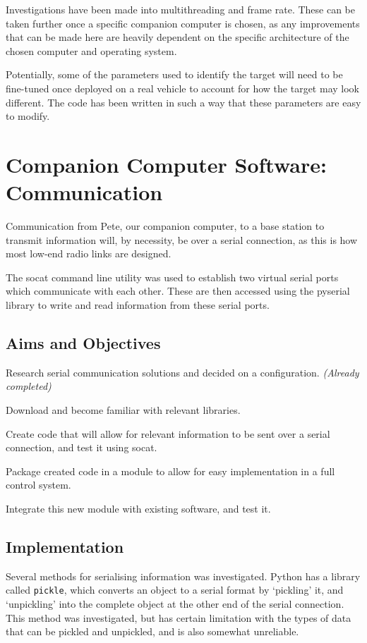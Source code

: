 \documentclass[11pt]{article}
\begin{document}
Investigations have been made into multithreading and frame rate. These can be taken further once a specific companion computer is chosen, as any improvements that can be made here are heavily dependent on the specific architecture of the chosen computer and operating system.

Potentially, some of the parameters used to identify the target will need to be fine-tuned once deployed on a real vehicle to account for how the target may look different. The code has been written in such a way that these parameters are easy to modify.

\section{Companion Computer Software: Communication}
Communication from Pete, our companion computer, to a base station to transmit information will, by necessity, be over a serial connection, as this is how most low-end radio links are designed.

The socat\cite{socat} command line utility was used to establish two virtual serial ports which communicate with each other. These are then accessed using the pyserial library to write and read information from these serial ports.

\subsection{Aims and Objectives}
\begin{compactenum}
    \item Research serial communication solutions and decided on a configuration. \emph{(Already completed)}
    \item Download and become familiar with relevant libraries.
    \item Create code that will allow for relevant information to be sent over a serial connection, and test it using socat.
    \item Package created code in a module to allow for easy implementation in a full control system.
    \item Integrate this new module with existing software, and test it.
\end{compactenum}


\subsection{Implementation}
Several methods for serialising information was investigated. Python has a library called \lstinline|pickle|, which converts an object to a serial format by `pickling' it, and `unpickling' into the complete object at the other end of the serial connection. This method was investigated, but has certain limitation with the types of data that can be pickled and unpickled, and is also somewhat unreliable.
\end{document}
